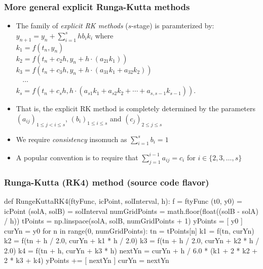 \documentclass[usenames,svgnames,dvipsnames,10pt]{beamer}
\begin{document}
\begin{frame}
\frametitle{More general explicit Runga-Kutta methods}

\begin{itemize} 

\item The family of \emph{explicit RK methods} ($s$-stage) is paramterized by: \\ 
      $y_{n+1} = y_n + \sum\limits_{i=1}^{s} hb_ik_i$ where \\ 
      $k_1 = f(t_n, y_n)$ \\ 
      $k_2 = f(t_n + c_2h, y_n +h \cdot (a_{21}k_1))$ \\ 
      $k_3 = f(t_n + c_3h, y_n + h \cdot (a_{31}k_1 + a_{32}k_2))$ \\ 
      $\phantom{k_4}\cdots$ \\ 
      $k_s = f(t_n + c_sh, h \cdot(a_{s1}k_1 + a_{s2}k_2 + \cdots + a_{s,s-1}k_{s-1}))$. 
\item That is, the explicit RK method is completely determined by the parameters 
      $(a_{ij})_{1 \leq j < i \leq s}$, $(b_i)_{1 \leq i \leq s}$ and $(c_j)_{2 \leq j \leq s}$
\item We require \emph{consistency} insomuch as $\sum\limits_{i=1}^s b_i = 1$ 
\item A popular convention is to require that $\sum\limits_{j=1}^{i-1} a_{ij} = c_i$ for $i \in \{2,3,\ldots,s\}$ 

\end{itemize} 

\end{frame}
\begin{frame}[fragile]
\frametitle{Runga-Kutta (RK4) method (source code flavor)}

\begin{center}
\begin{pythoncode}
def RungeKuttaRK4(ftyFunc, icPoint, solInterval, h):
    f = ftyFunc
    (t0, y0) = icPoint
    (solA, solB) = solInterval
    numGridPoints = math.floor(float((solB - solA) / h))
    tPoints = np.linspace(solA, solB, numGridPoints + 1)
    yPoints = [ y0 ]
    curYn = y0
    for n in range(0, numGridPoints):
        tn = tPoints[n]
        k1 = f(tn, curYn)
        k2 = f(tn + h / 2.0, curYn + k1 * h / 2.0)
        k3 = f(tn + h / 2.0, curYn + k2 * h / 2.0)
        k4 = f(tn + h, curYn + k3 * h)
        nextYn = curYn + h / 6.0 * (k1 + 2 * k2 + 2 * k3 + k4)
        yPoints += [ nextYn ]
        curYn = nextYn
\end{pythoncode}
\end{center}

\end{frame}
\end{document}
